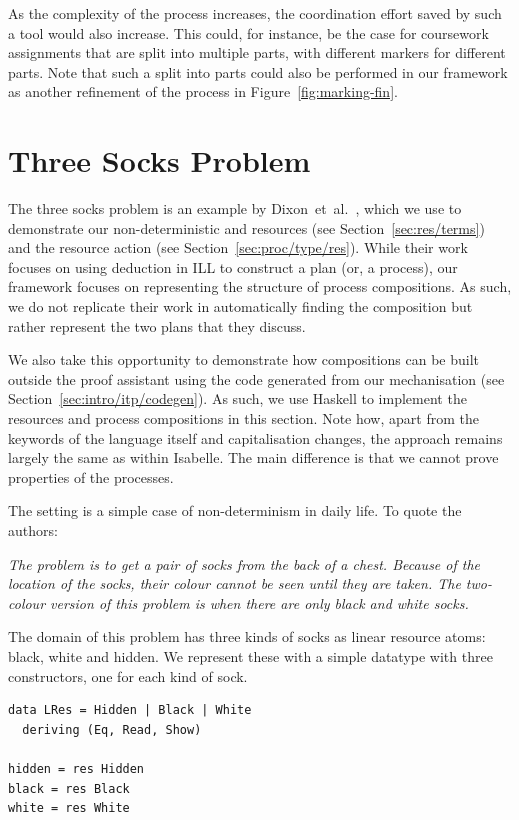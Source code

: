 \documentclass[class=smolathesis,crop=false]{standalone}
\begin{document}
As the complexity of the process increases, the coordination effort saved by such a tool would also increase.
This could, for instance, be the case for coursework assignments that are split into multiple parts, with different markers for different parts.
Note that such a split into parts could also be performed in our framework as another refinement of the process in Figure~\ref{fig:marking-fin}.

\section{Three Socks Problem}
\label{sec:cases/three-socks}

The three socks problem is an example by Dixon~et~al.~\cite{dixon_et_al-2009}, which we use to demonstrate our non-deterministic and  resources (see Section~\ref{sec:res/terms}) and the  resource action (see Section~\ref{sec:proc/type/res}).
While their work focuses on using deduction in ILL to construct a plan (or, a process), our framework focuses on representing the structure of process compositions.
As such, we do not replicate their work in automatically finding the composition but rather represent the two plans that they discuss.

\cbstart
We also take this opportunity to demonstrate how compositions can be built outside the proof assistant using the code generated from our mechanisation (see Section~\ref{sec:intro/itp/codegen}).
As such, we use Haskell to implement the resources and process compositions in this section.
Note how, apart from the keywords of the language itself and capitalisation changes, the approach remains largely the same as within Isabelle.
The main difference is that we cannot prove properties of the processes.
\cbend

The setting is a simple case of non-determinism in daily life.
To quote the authors:
\begin{displayquote}
  \itshape
  The problem is to get a pair of socks from the back of a chest.
  Because of the location of the socks, their colour cannot be seen until they are taken.
  The two-colour version of this problem is when there are only black and white socks.
\end{displayquote}

The domain of this problem has three kinds of socks as linear resource atoms: black, white and hidden.
\cbstart
We represent these with a simple datatype with three constructors, one for each kind of sock.
\begin{lstlisting}[label=lst:socks-res,caption=Linear atoms for picking socks (with abbreviations),basicstyle=\footnotesize\ttfamily,columns=flexible,breaklines=true]
data LRes = Hidden | Black | White
  deriving (Eq, Read, Show)

hidden = res Hidden
black = res Black
white = res White
\end{lstlisting}
\end{document}
